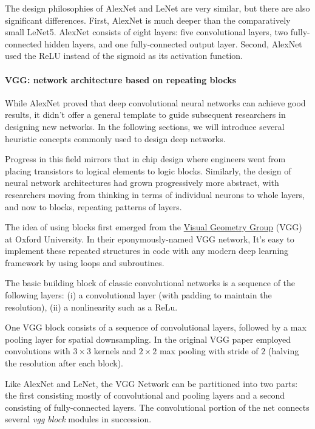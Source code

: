 The design philosophies of AlexNet and LeNet are very similar, but there are also significant differences. First, AlexNet is much deeper than the comparatively small LeNet5. AlexNet consists of eight layers: five convolutional layers, two fully-connected hidden layers, and one fully-connected output layer. Second, AlexNet used the ReLU instead of the sigmoid as its activation function.

\paragraph{VGG: network architecture based on repeating blocks}

While AlexNet proved that deep convolutional neural networks can achieve good results, it didn't offer a general template to guide subsequent researchers in designing new networks.  In the following sections, we will introduce several heuristic concepts commonly used to design deep networks.

Progress in this field mirrors that in chip design where engineers went from placing transistors to logical elements to logic blocks. Similarly, the design of neural network architectures  had grown progressively more abstract, with researchers moving from thinking in terms of individual neurons to whole layers, and now to blocks, repeating patterns of layers.

The idea of using blocks first emerged from the \href{http://www.robots.ox.ac.uk/~vgg/}{Visual Geometry Group} (VGG) at Oxford University. In their eponymously-named VGG network, It's easy to implement these repeated structures in code with any modern deep learning framework by using loops and subroutines. 

The basic building block of classic convolutional networks is a sequence of the following layers: (i) a convolutional layer  (with padding to maintain the resolution), (ii) a nonlinearity such as a ReLu.

One VGG block consists of a sequence of convolutional layers,  followed by a max pooling layer for spatial downsampling. In the original VGG paper \citet{Simonyan2015} employed convolutions with $3\times3$ kernels and $2 \times 2$ max pooling with stride of $2$ (halving the resolution after each block).

Like AlexNet and LeNet, the VGG Network can be partitioned into two parts: the first consisting mostly of convolutional and pooling layers and a second consisting of fully-connected layers. The convolutional portion of the net connects several \textit{vgg block} modules in succession.

